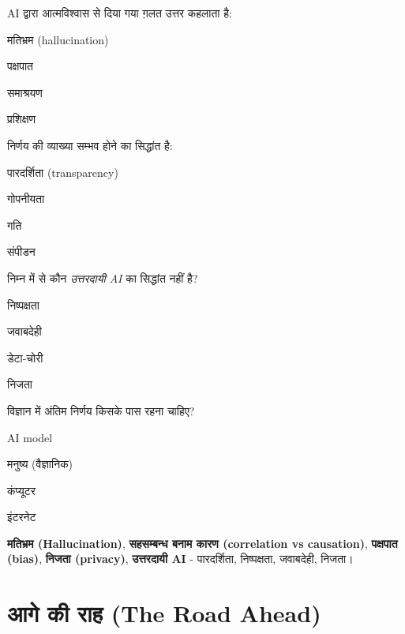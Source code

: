\begin{mcq}
  \item AI द्वारा आत्मविश्वास से दिया गया ग़लत उत्तर कहलाता है:
    \begin{choices}\item मतिभ्रम (hallucination) \item पक्षपात
      \item समाश्रयण \item प्रशिक्षण\end{choices}
  \item निर्णय की व्याख्या सम्भव होने का सिद्धांत है:
    \begin{choices}\item पारदर्शिता (transparency) \item गोपनीयता
      \item गति \item संपीडन\end{choices}
  \item निम्न में से कौन \emph{उत्तरदायी AI} का सिद्धांत नहीं है?
    \begin{choices}\item निष्पक्षता \item जवाबदेही
      \item डेटा-चोरी \item निजता\end{choices}
  \item विज्ञान में अंतिम निर्णय किसके पास रहना चाहिए?
    \begin{choices}\item AI model \item मनुष्य (वैज्ञानिक)
      \item कंप्यूटर \item इंटरनेट\end{choices}
\end{mcq}

\begin{mukhyashabd}
\textbf{मतिभ्रम (Hallucination)}, \textbf{सहसम्बन्ध बनाम कारण (correlation vs causation)},
\textbf{पक्षपात (bias)}, \textbf{निजता (privacy)}, \textbf{उत्तरदायी AI} -
पारदर्शिता, निष्पक्षता, जवाबदेही, निजता।
\end{mukhyashabd}

\section*{आगे की राह (The Road Ahead)}


